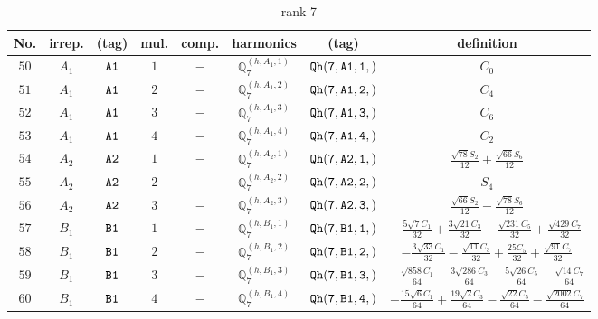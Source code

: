 \documentclass[fleqn,8pt]{jsarticle}
\begin{document}
\begin{table}[ht!]
\begin{center}
\caption{rank 7}
\renewcommand{\arraystretch}{1.3}
\begin{tabular}{cccccccc} \hline \hline
No. & irrep. & (tag) & mul. & comp. & harmonics & (tag) & definition \\ \hline
$ 50 $ & $ A_{1} $ & $ {\tt A1} $ & $ 1 $ & $ - $ & $ \mathbb{Q}_{7}^{(h,A_{1},1)} $ & $ {\tt Qh(7,A1,1,)} $ & $ C_{0} $ \\
$ 51 $ & $ A_{1} $ & $ {\tt A1} $ & $ 2 $ & $ - $ & $ \mathbb{Q}_{7}^{(h,A_{1},2)} $ & $ {\tt Qh(7,A1,2,)} $ & $ C_{4} $ \\
$ 52 $ & $ A_{1} $ & $ {\tt A1} $ & $ 3 $ & $ - $ & $ \mathbb{Q}_{7}^{(h,A_{1},3)} $ & $ {\tt Qh(7,A1,3,)} $ & $ C_{6} $ \\
$ 53 $ & $ A_{1} $ & $ {\tt A1} $ & $ 4 $ & $ - $ & $ \mathbb{Q}_{7}^{(h,A_{1},4)} $ & $ {\tt Qh(7,A1,4,)} $ & $ C_{2} $ \\
$ 54 $ & $ A_{2} $ & $ {\tt A2} $ & $ 1 $ & $ - $ & $ \mathbb{Q}_{7}^{(h,A_{2},1)} $ & $ {\tt Qh(7,A2,1,)} $ & $ \frac{\sqrt{78} S_{2}}{12} + \frac{\sqrt{66} S_{6}}{12} $ \\
$ 55 $ & $ A_{2} $ & $ {\tt A2} $ & $ 2 $ & $ - $ & $ \mathbb{Q}_{7}^{(h,A_{2},2)} $ & $ {\tt Qh(7,A2,2,)} $ & $ S_{4} $ \\
$ 56 $ & $ A_{2} $ & $ {\tt A2} $ & $ 3 $ & $ - $ & $ \mathbb{Q}_{7}^{(h,A_{2},3)} $ & $ {\tt Qh(7,A2,3,)} $ & $ \frac{\sqrt{66} S_{2}}{12} - \frac{\sqrt{78} S_{6}}{12} $ \\
$ 57 $ & $ B_{1} $ & $ {\tt B1} $ & $ 1 $ & $ - $ & $ \mathbb{Q}_{7}^{(h,B_{1},1)} $ & $ {\tt Qh(7,B1,1,)} $ & $ - \frac{5 \sqrt{7} C_{1}}{32} + \frac{3 \sqrt{21} C_{3}}{32} - \frac{\sqrt{231} C_{5}}{32} + \frac{\sqrt{429} C_{7}}{32} $ \\
$ 58 $ & $ B_{1} $ & $ {\tt B1} $ & $ 2 $ & $ - $ & $ \mathbb{Q}_{7}^{(h,B_{1},2)} $ & $ {\tt Qh(7,B1,2,)} $ & $ - \frac{3 \sqrt{33} C_{1}}{32} - \frac{\sqrt{11} C_{3}}{32} + \frac{25 C_{5}}{32} + \frac{\sqrt{91} C_{7}}{32} $ \\
$ 59 $ & $ B_{1} $ & $ {\tt B1} $ & $ 3 $ & $ - $ & $ \mathbb{Q}_{7}^{(h,B_{1},3)} $ & $ {\tt Qh(7,B1,3,)} $ & $ - \frac{\sqrt{858} C_{1}}{64} - \frac{3 \sqrt{286} C_{3}}{64} - \frac{5 \sqrt{26} C_{5}}{64} - \frac{\sqrt{14} C_{7}}{64} $ \\
$ 60 $ & $ B_{1} $ & $ {\tt B1} $ & $ 4 $ & $ - $ & $ \mathbb{Q}_{7}^{(h,B_{1},4)} $ & $ {\tt Qh(7,B1,4,)} $ & $ - \frac{15 \sqrt{6} C_{1}}{64} + \frac{19 \sqrt{2} C_{3}}{64} - \frac{\sqrt{22} C_{5}}{64} - \frac{\sqrt{2002} C_{7}}{64} $ \\

\end{tabular}
\end{center}
\end{table}
\end{document}
